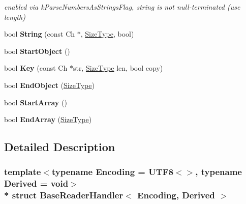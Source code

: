 \begin{DoxyCompactItemize}
\begin{DoxyCompactList}\small\item\em enabled via k\+Parse\+Numbers\+As\+Strings\+Flag, string is not null-\/terminated (use length) \end{DoxyCompactList}\item 
bool {\bfseries String} (const Ch $\ast$, \hyperlink{rapidjson_8h_a5ed6e6e67250fadbd041127e6386dcb5}{Size\+Type}, bool)\hypertarget{structBaseReaderHandler_a3ac69e6326d0aeef7b1f2619742bbe00}{}\label{structBaseReaderHandler_a3ac69e6326d0aeef7b1f2619742bbe00}

\item 
bool {\bfseries Start\+Object} ()\hypertarget{structBaseReaderHandler_ab0a7d9bcececb8d6ed748656f67f4917}{}\label{structBaseReaderHandler_ab0a7d9bcececb8d6ed748656f67f4917}

\item 
bool {\bfseries Key} (const Ch $\ast$str, \hyperlink{rapidjson_8h_a5ed6e6e67250fadbd041127e6386dcb5}{Size\+Type} len, bool copy)\hypertarget{structBaseReaderHandler_abc50b2e7e411b7b731715e05cd01e2eb}{}\label{structBaseReaderHandler_abc50b2e7e411b7b731715e05cd01e2eb}

\item 
bool {\bfseries End\+Object} (\hyperlink{rapidjson_8h_a5ed6e6e67250fadbd041127e6386dcb5}{Size\+Type})\hypertarget{structBaseReaderHandler_a0406cee0af26bc3a0b7fb2414537b0ab}{}\label{structBaseReaderHandler_a0406cee0af26bc3a0b7fb2414537b0ab}

\item 
bool {\bfseries Start\+Array} ()\hypertarget{structBaseReaderHandler_a9dbb1143a250a904bb18a174553a3a00}{}\label{structBaseReaderHandler_a9dbb1143a250a904bb18a174553a3a00}

\item 
bool {\bfseries End\+Array} (\hyperlink{rapidjson_8h_a5ed6e6e67250fadbd041127e6386dcb5}{Size\+Type})\hypertarget{structBaseReaderHandler_ae9d60a8779b6a77a7f283d64961879fb}{}\label{structBaseReaderHandler_ae9d60a8779b6a77a7f283d64961879fb}

\end{DoxyCompactItemize}


\subsection{Detailed Description}
\subsubsection*{template$<$typename Encoding = U\+T\+F8$<$$>$, typename Derived = void$>$\\*
struct Base\+Reader\+Handler$<$ Encoding, Derived $>$}

